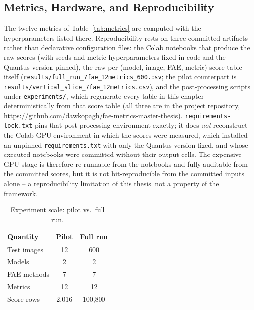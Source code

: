 \subsection{Metrics, Hardware, and Reproducibility}

The twelve metrics of Table~\ref{tab:metrics} are computed with the
hyperparameters listed there. Reproducibility rests on three committed
artifacts rather than declarative configuration files: the Colab notebooks
that produce the raw scores (with seeds and metric hyperparameters fixed in
code and the Quantus version pinned), the raw per-(model, image, FAE,
metric) score table itself
(\texttt{results/full\_run\_7fae\_12metrics\_600.csv}; the pilot counterpart
is \texttt{results/vertical\_slice\_7fae\_12metrics.csv}), and the
post-processing scripts under \texttt{experiments/}, which regenerate every
table in this chapter deterministically from that score table (all three
are in the project repository, \url{https://github.com/dawkopagh/fae-metrics-master-thesis}).
\texttt{requirements-lock.txt} pins that post-processing environment
exactly; it does \emph{not} reconstruct the Colab GPU environment in which
the scores were measured, which installed an unpinned
\texttt{requirements.txt} with only the Quantus version fixed, and whose
executed notebooks were committed without their output cells. The
expensive GPU stage is therefore re-runnable from the notebooks and fully
auditable from the committed scores, but it is not bit-reproducible from
the committed inputs alone -- a reproducibility limitation of this thesis,
not a property of the framework.

\begin{table}[H]
\centering
\caption{Experiment scale: pilot vs.\ full run.}
\begin{tabular}{lcc}
\toprule
Quantity & Pilot & Full run \\
\midrule
Test images        & 12  & 600 \\
Models             & 2   & 2 \\
FAE methods        & 7   & 7 \\
Metrics            & 12  & 12 \\
Score rows         & 2{,}016 & 100{,}800 \\
\bottomrule
\end{tabular}
\label{tab:exp-scale}
\end{table}

